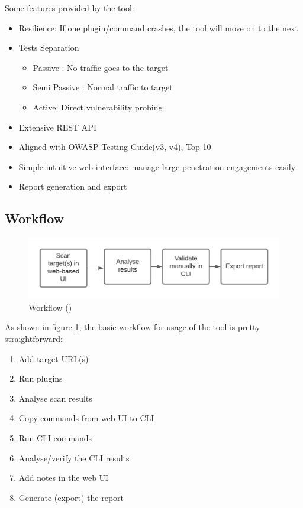Some features provided by the tool:

\begin{itemize}
	\item Resilience: If one plugin/command crashes, the tool will move on to the next
	\item Tests Separation
	\begin{itemize}
		\item Passive : No traffic goes to the target
		\item Semi Passive : Normal traffic to target
		\item Active: Direct vulnerability probing
	\end{itemize}
	\item Extensive REST API
	\item Aligned with OWASP Testing Guide(v3, v4), Top 10
	\item Simple intuitive web interface: manage large penetration engagements easily
	\item Report generation and export
\end{itemize}

\subsection{Workflow}

\begin{figure}[H]
	\centering
	\includegraphics[width=12cm,keepaspectratio=true]{pictures/workflow1.png}
	\caption{
		Workflow (\cite{Brennen.11.06.2021})
	}
	\label{fig:workflow1}
\end{figure}

As shown in figure \ref{fig:workflow1}, the basic workflow for usage of the tool is pretty straightforward:

\begin{enumerate}
	\item Add target URL(s)
	\item Run plugins
	\item Analyse scan results
	\item Copy commands from web UI to CLI
	\item Run CLI commands
	\item Analyse/verify the CLI results
	\item Add notes in the web UI
	\item Generate (export) the report
\end{enumerate}


